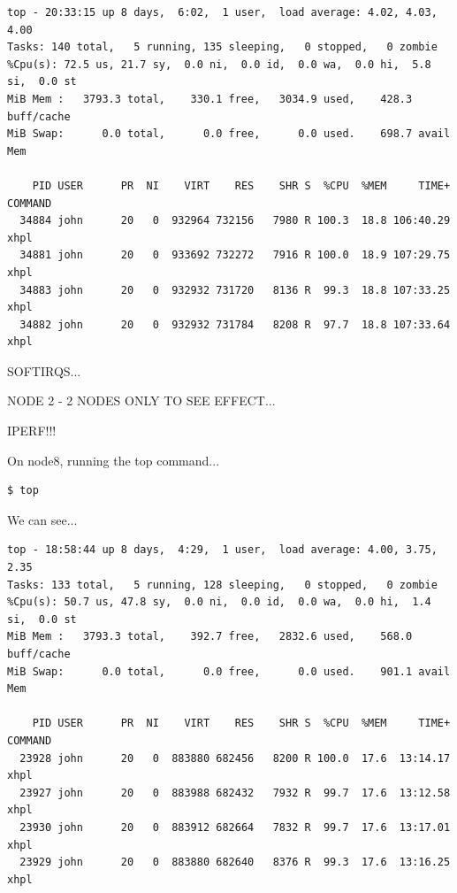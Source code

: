 \documentclass{report}
\begin{document}
\lstset{style=type}
\begin{lstlisting}
top - 20:33:15 up 8 days,  6:02,  1 user,  load average: 4.02, 4.03, 4.00
Tasks: 140 total,   5 running, 135 sleeping,   0 stopped,   0 zombie
%Cpu(s): 72.5 us, 21.7 sy,  0.0 ni,  0.0 id,  0.0 wa,  0.0 hi,  5.8 si,  0.0 st
MiB Mem :   3793.3 total,    330.1 free,   3034.9 used,    428.3 buff/cache
MiB Swap:      0.0 total,      0.0 free,      0.0 used.    698.7 avail Mem 

    PID USER      PR  NI    VIRT    RES    SHR S  %CPU  %MEM     TIME+ COMMAND                                                   
  34884 john      20   0  932964 732156   7980 R 100.3  18.8 106:40.29 xhpl                                                      
  34881 john      20   0  933692 732272   7916 R 100.0  18.9 107:29.75 xhpl                                                      
  34883 john      20   0  932932 731720   8136 R  99.3  18.8 107:33.25 xhpl                                                      
  34882 john      20   0  932932 731784   8208 R  97.7  18.8 107:33.64 xhpl                                                      
\end{lstlisting}

SOFTIRQS...


NODE 2 - 2 NODES ONLY TO SEE EFFECT...

IPERF!!!

On node8, running the top command...

\lstset{style=type}
\begin{lstlisting}
$ top
\end{lstlisting}

We can see...

\lstset{style=type}
\begin{lstlisting}
top - 18:58:44 up 8 days,  4:29,  1 user,  load average: 4.00, 3.75, 2.35
Tasks: 133 total,   5 running, 128 sleeping,   0 stopped,   0 zombie
%Cpu(s): 50.7 us, 47.8 sy,  0.0 ni,  0.0 id,  0.0 wa,  0.0 hi,  1.4 si,  0.0 st
MiB Mem :   3793.3 total,    392.7 free,   2832.6 used,    568.0 buff/cache
MiB Swap:      0.0 total,      0.0 free,      0.0 used.    901.1 avail Mem 

    PID USER      PR  NI    VIRT    RES    SHR S  %CPU  %MEM     TIME+ COMMAND                                                   
  23928 john      20   0  883880 682456   8200 R 100.0  17.6  13:14.17 xhpl                                                      
  23927 john      20   0  883988 682432   7932 R  99.7  17.6  13:12.58 xhpl                                                      
  23930 john      20   0  883912 682664   7832 R  99.7  17.6  13:17.01 xhpl                                                      
  23929 john      20   0  883880 682640   8376 R  99.3  17.6  13:16.25 xhpl  
\end{lstlisting}
\end{document}
